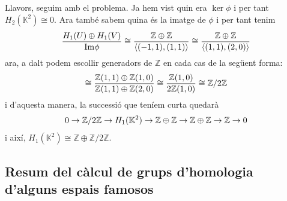 \documentclass[../main.tex]{subfiles}
\begin{document}
\begin{sol}
Llavors, seguim amb el problema. Ja hem vist quin era $\ker\phi$ i per tant $H_2(\mathbb{K}^2)\cong 0$. Ara també sabem quina és la imatge de $\phi$ i per tant tenim
\begin{equation}
    \notag
    \frac{H_1(U)\oplus H_1(V)}{\mathrm{Im}\phi}\cong\frac{\mathbb{Z}\oplus\mathbb{Z}}{\langle(-1,1),(1,1)\rangle}\cong\frac{\mathbb{Z}\oplus\mathbb{Z}}{\langle (1,1),(2,0)\rangle}
\end{equation}
ara, a dalt podem escollir generadors de $\mathbb{Z}$ en cada cas de la següent forma:
\begin{equation}
    \notag
    \cong\frac{\mathbb{Z}(1,1)\oplus\mathbb{Z}(1,0)}{\mathbb{Z}(1,1)\oplus\mathbb{Z}(2,0)}\cong\frac{\mathbb{Z}(1,0)}{2\mathbb{Z}(1,0)}\cong\mathbb{Z}/2\mathbb{Z}
\end{equation}
i d'aquesta manera, la successió que teníem curta quedarà
\begin{equation}
    \notag
    0\rightarrow\mathbb{Z}/2\mathbb{Z}\rightarrow H_1(\mathbb{K}^2)\rightarrow \mathbb{Z}\oplus\mathbb{Z}\rightarrow\mathbb{Z}\oplus\mathbb{Z}\rightarrow \mathbb{Z}\rightarrow 0 
\end{equation}
i així, $H_1(\mathbb{K}^2)\cong\mathbb{Z}\oplus\mathbb{Z}/2\mathbb{Z}$.
\end{sol}


\subsection*{Resum del càlcul de grups d'homologia d'alguns espais famosos}
\end{document}

